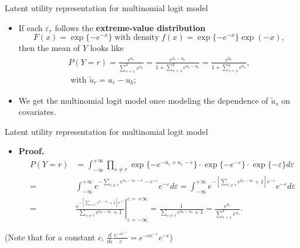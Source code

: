 \documentclass{beamer}
\begin{document}
\begin{frame}{Latent utility representation for multinomial logit model}
\begin{itemize}
\item
If each $\varepsilon_r$ follows the \textbf{extreme-value distribution}
$$ F(x)=\exp\{-e^{-x}\}\;\mbox{with density}\;
f(x)=\exp\{-e^{-x}\}\exp(-x),$$
then the mean of $Y$ looks like
\begin{multline*}
P(Y\!=\!r)=\frac{e^{u_r}}{\sum_{s=1}^k e^{u_s}}=\frac{e^{u_r-u_k }}{1\!+\!\sum_{s=1}^q e^{u_s-u_k}}
=\frac{e^{\tilde{u}_r}}{1\!+\!\sum_{s=1}^q e^{\tilde{u}_s}}, \\
\;\mbox{with $\tilde{u}_r=u_r-u_k$;}
\end{multline*}
\item We get  the  multinomial logit model once modeling the dependence of $\tilde{u}_s$ on covariates. 
\end{itemize}
\end{frame}

\begin{frame} {Latent utility representation for multinomial logit model}
\begin{itemize}
\item 
\textbf{Proof.} {\footnotesize
\begin{eqnarray*}
&P(Y=r)& = \int_{-\infty}^{+\infty}\prod_{s\neq r}\exp\{-e^{-u_r+u_s-\varepsilon}\}\cdot \exp\{-e^{-
\varepsilon}\}\cdot \exp\{-\varepsilon\} d\varepsilon \\
&=& \int_{-\infty}^{+\infty}e^{-\sum_{s\neq r}e^{u_s-u_r-\varepsilon}-e^{-\varepsilon}}
e^{-\varepsilon}d\varepsilon = \int_{-\infty}^{+\infty}e^{-\left[\sum_{s\neq r}e^{u_s-u_r}+1\right]e^{-\varepsilon}}
e^{-\varepsilon}d\varepsilon \\
&=& \left.\frac{e^{-\left[\sum_{s\neq r}e^{u_s-u_r}+1\right]e^{-\varepsilon}} }{\sum_{s\neq r}e^{u_s-u_r}+1}
\right|_{\varepsilon = -\infty}^{\varepsilon = +\infty} =\frac{1}{\sum_{s\neq r}e^{u_s-u_r}+1}=\frac{e^{u_r}}{\sum_{s=1}^k e^{u_s}}.
\end{eqnarray*}}

\end{itemize}
(Note that for  a constant $c$, \quad $\frac{d}{d \varepsilon} \frac{e^{-ce^{-\varepsilon} }}{c} = e^{- c e^{-\varepsilon}} e^{-\epsilon}$)
\end{frame}
\end{document}
